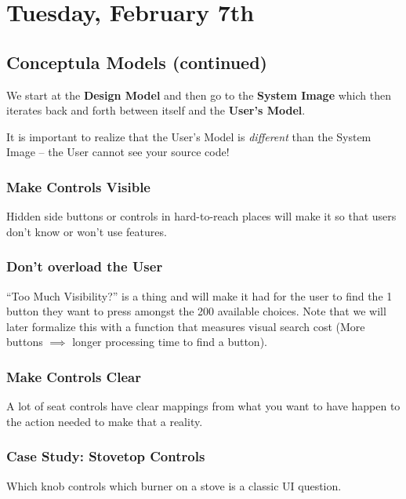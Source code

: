 \section{Tuesday, February 7th}
\subsection{Conceptula Models (continued)}
We start at the \textbf{Design Model} and then go to the \textbf{System Image} which then iterates back and forth between itself and the \textbf{User's Model}.

It is important to realize that the User's Model is \textit{different} than the System Image -- the User cannot see your source code!

\subsubsection{Make Controls Visible}
Hidden side buttons or controls in hard-to-reach places will make it so that users don't know or won't use features.

\subsubsection{Don't overload the User}
``Too Much Visibility?'' is a thing and will make it had for the user to find the 1 button they want to press amongst the 200 available choices. Note that we will later formalize this with a function that measures visual search cost (More buttons $\implies$ longer processing time to find a button).

\subsubsection{Make Controls Clear}
A lot of seat controls have clear mappings from what you want to have happen to the action needed to make that a reality.

\subsubsection{Case Study: Stovetop Controls}
Which knob controls which burner on a stove is a classic UI question.

